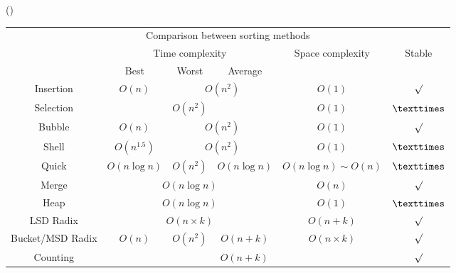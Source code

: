 \item \begin{theorem}{()} \quad\quad \begin{table}[H]
        \centering
        \begin{tabular}{|c|c|c|c|c|c|}
            \hline
            \multicolumn{6}{|c|}{Comparison between sorting methods} \\
            \Xhline{3\arrayrulewidth}
            \multirow{2}{*}{Method} & \multicolumn{3}{c|}{Time complexity} & \multirow{2}{*}{Space complexity} & \multirow{2}{*}{Stable} \\
            \cline{2-4}
            & Best & Worst & Average & & \\
            \Xhline{2\arrayrulewidth}
            Insertion & $O(n)$ & \multicolumn{2}{c|}{$O(n^2)$} & $O(1)$ & $\surd$ \\
            \hline
            Selection & \multicolumn{3}{c|}{$O(n^2)$} & $O(1)$ & $\texttimes$ \\
            \hline
            Bubble & $O(n)$ & \multicolumn{2}{c|}{$O(n^2)$} & $O(1)$ & $\surd$ \\
            \hline
            Shell & $O(n^{1.5})$ & \multicolumn{2}{c|}{$O(n^2)$} & $O(1)$ & $\texttimes$ \\
            \hline
            Quick & $O(n\log n)$ & $O(n^2)$ & $O(n\log n)$ & $O(n\log n) \sim O(n)$ & $\texttimes$ \\
            \hline
            Merge & \multicolumn{3}{c|}{$O(n\log n)$} & $O(n)$ & $\surd$ \\
            \hline
            Heap & \multicolumn{3}{c|}{$O(n\log n)$} & $O(1)$ & $\texttimes$ \\
            \hline
            LSD Radix & \multicolumn{3}{c|}{$O(n \times k)$} & $O(n + k)$ & $\surd$ \\
            \hline
            Bucket/MSD Radix & $O(n)$ & $O(n^2)$ & $O(n + k)$ & $O(n \times k)$ & $\surd$ \\
            \hline
            Counting & \multicolumn{4}{c|}{$O(n + k)$} & $\surd$ \\
            \hline
        \end{tabular}
    \end{table}
\end{theorem}
